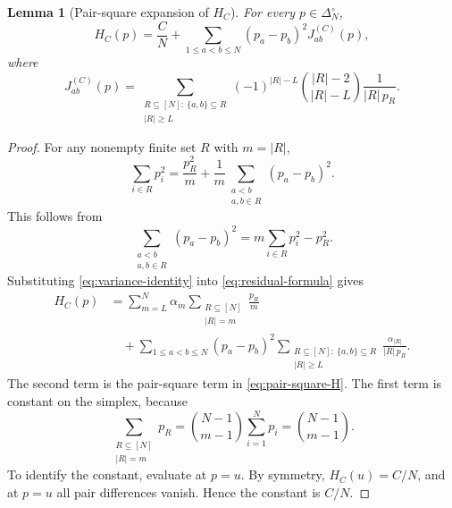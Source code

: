 \documentclass[11pt]{article}
\newtheorem{lemma}[theorem]{Lemma}
\theoremstyle{remark}
\newcommand{\card}[1]{\lvert #1\rvert}
\begin{document}
\begin{lemma}[Pair-square expansion of $H_C$]\label{lem:pair-square}
For every $p\in\Delta_N^\circ$,
\begin{equation}\label{eq:pair-square-H}
        H_C(p)
        =
        \frac{C}{N}
        +
        \sum_{1\le a<b\le N}(p_a-p_b)^2J_{ab}^{(C)}(p),
\end{equation}
where
\begin{equation}\label{eq:J-def}
        J_{ab}^{(C)}(p)
        =
        \sum_{\substack{R\subseteq[N]:\ \{a,b\}\subseteq R\\ \card R\ge L}}
        (-1)^{\card R-L}
        \binom{\card R-2}{\card R-L}
        \frac{1}{\card R\,p_R}.
\end{equation}
\end{lemma}

\begin{proof}
For any nonempty finite set $R$ with $m=\card R$,
\begin{equation}\label{eq:variance-identity}
        \sum_{i\in R}p_i^2
        =
        \frac{p_R^2}{m}
        +
        \frac{1}{m}
        \sum_{\substack{a<b\\ a,b\in R}}(p_a-p_b)^2.
\end{equation}
This follows from
\[
        \sum_{\substack{a<b\\ a,b\in R}}(p_a-p_b)^2
        =m\sum_{i\in R}p_i^2-p_R^2.
\]
Substituting \eqref{eq:variance-identity} into
\eqref{eq:residual-formula} gives
\begin{align*}
        H_C(p)
        &=
        \sum_{m=L}^N\alpha_m
        \sum_{\substack{R\subseteq[N]\\ \card R=m}}
        \frac{p_R}{m} \\
        &\quad+
        \sum_{1\le a<b\le N}(p_a-p_b)^2
        \sum_{\substack{R\subseteq[N]:\ \{a,b\}\subseteq R\\ \card R\ge L}}
        \frac{\alpha_{\card R}}{\card R\,p_R}.
\end{align*}
The second term is the pair-square term in \eqref{eq:pair-square-H}.  The
first term is constant on the simplex, because
\[
        \sum_{\substack{R\subseteq[N]\\ \card R=m}}p_R
        =
        \binom{N-1}{m-1}\sum_{i=1}^Np_i
        =
        \binom{N-1}{m-1}.
\]
To identify the constant, evaluate at $p=u$.  By symmetry,
$H_C(u)=C/N$, and at $p=u$ all pair differences vanish.  Hence the
constant is $C/N$.
\end{proof}
\end{document}
